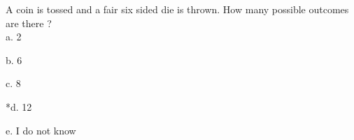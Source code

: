
A coin is tossed and a fair six sided die is thrown. How many
possible outcomes are there ? \\

a. 2

b. 6

c. 8

*d. 12

e. I do not know \\
